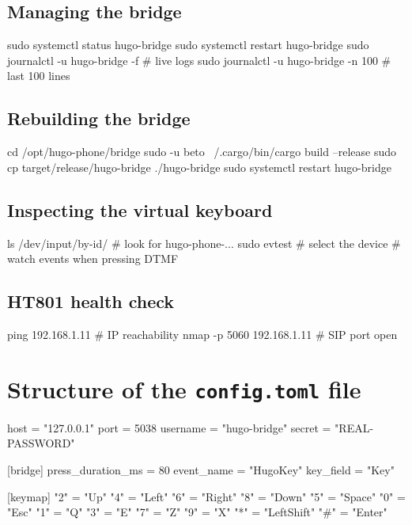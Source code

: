 \subsection{Managing the bridge}

\begin{shellcode}
sudo systemctl status hugo-bridge
sudo systemctl restart hugo-bridge
sudo journalctl -u hugo-bridge -f      # live logs
sudo journalctl -u hugo-bridge -n 100  # last 100 lines
\end{shellcode}

\subsection{Rebuilding the bridge}

\begin{shellcode}
cd /opt/hugo-phone/bridge
sudo -u beto ~/.cargo/bin/cargo build --release
sudo cp target/release/hugo-bridge ./hugo-bridge
sudo systemctl restart hugo-bridge
\end{shellcode}

\subsection{Inspecting the virtual keyboard}

\begin{shellcode}
ls /dev/input/by-id/                   # look for hugo-phone-...
sudo evtest                            # select the device
                                       # watch events when pressing DTMF
\end{shellcode}

\subsection{HT801 health check}

\begin{shellcode}
ping 192.168.1.11                      # IP reachability
nmap -p 5060 192.168.1.11              # SIP port open
\end{shellcode}

\section{Structure of the \texttt{config.toml} file}

\begin{tomlcode}
[ami]
host = "127.0.0.1"
port = 5038
username = "hugo-bridge"
secret = "REAL-PASSWORD"

[bridge]
press_duration_ms = 80
event_name = "HugoKey"
key_field = "Key"

[keymap]
"2" = "Up"
"4" = "Left"
"6" = "Right"
"8" = "Down"
"5" = "Space"
"0" = "Esc"
"1" = "Q"
"3" = "E"
"7" = "Z"
"9" = "X"
"*" = "LeftShift"
"#" = "Enter"
\end{tomlcode}

